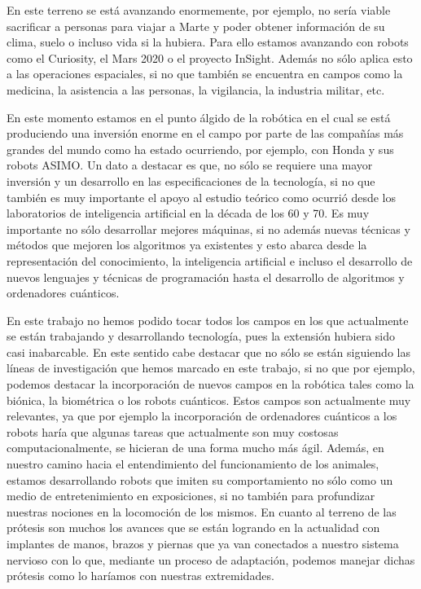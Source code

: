 \documentclass[a4paper,11pt]{article}
\begin{document}
\vspace{10px}

En este terreno se está avanzando enormemente, por ejemplo, no sería viable sacrificar a personas para viajar a Marte y poder obtener información de su clima, suelo o incluso vida si la hubiera. Para ello estamos avanzando con robots como el Curiosity, el Mars 2020 o el proyecto InSight. Además no sólo aplica esto a las operaciones espaciales, si no que también se encuentra en campos como la medicina, la asistencia a las personas, la vigilancia, la industria militar, etc.

\vspace{10px}

En este momento estamos en el punto álgido de la robótica en el cual se está produciendo una inversión enorme en el campo por parte de las compañías más grandes del mundo como ha estado ocurriendo, por ejemplo, con Honda y sus robots ASIMO. Un dato a destacar es que, no sólo se requiere una mayor inversión y un desarrollo en las especificaciones de la tecnología, si no que también es muy importante el apoyo al estudio teórico como ocurrió desde los laboratorios de inteligencia artificial en la década de los 60 y 70. Es muy importante no sólo desarrollar mejores máquinas, si no además nuevas técnicas y métodos que mejoren los algoritmos ya existentes y esto abarca desde la representación del conocimiento, la inteligencia artificial e incluso el desarrollo de nuevos lenguajes y técnicas de programación hasta el desarrollo de algoritmos y ordenadores cuánticos.

\vspace{10px}

En este trabajo no hemos podido tocar todos los campos en los que actualmente se están trabajando y desarrollando tecnología, pues la extensión hubiera sido casi inabarcable. En este sentido cabe destacar que no sólo se están siguiendo las líneas de investigación que hemos marcado en este trabajo, si no que por ejemplo, podemos destacar la incorporación de nuevos campos en la robótica tales como la biónica, la biométrica o los robots cuánticos. Estos campos son actualmente muy relevantes, ya que por ejemplo la incorporación de ordenadores cuánticos a los robots haría que algunas tareas que actualmente son muy costosas computacionalmente, se hicieran de una forma mucho más ágil. Además, en nuestro camino hacia el entendimiento del funcionamiento de los animales, estamos desarrollando robots que imiten su comportamiento no sólo como un medio de entretenimiento en exposiciones, si no también para profundizar nuestras nociones en la locomoción de los mismos. En cuanto al terreno de las prótesis son muchos los avances que se están logrando en la actualidad con implantes de manos, brazos y piernas que ya van conectados a nuestro sistema nervioso con lo que, mediante un proceso de adaptación, podemos manejar dichas prótesis como lo haríamos con nuestras extremidades.
\end{document}
